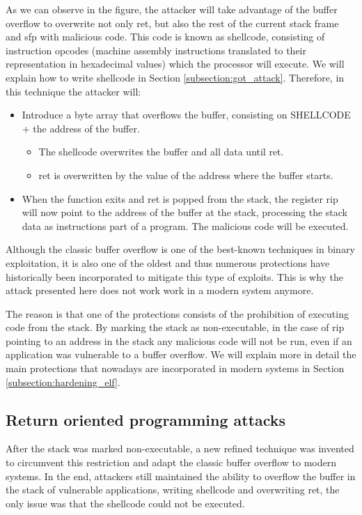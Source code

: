 As we can observe in the figure, the attacker will take advantage of the buffer overflow to overwrite not only ret, but also the rest of the current stack frame and sfp with malicious code. This code is known as shellcode, consisting of instruction opcodes (machine assembly instructions translated to their representation in hexadecimal values) which the processor will execute. We will explain how to write shellcode in Section \ref{subsection:got_attack}. Therefore, in this technique the attacker will:
\begin{itemize}
\item Introduce a byte array that overflows the buffer, consisting on SHELLCODE + the address of the buffer.
\begin{itemize}
	\item The shellcode overwrites the buffer and all data until ret.
	\item ret is overwritten by the value of the address where the buffer starts.
\end{itemize}
\item When the function exits and ret is popped from the stack, the register rip will now point to the address of the buffer at the stack, processing the stack data as instructions part of a program. The malicious code will be executed.
\end{itemize}

Although the classic buffer overflow is one of the best-known techniques in binary exploitation, it is also one of the oldest and thus numerous protections have historically been incorporated to mitigate this type of exploits. This is why the attack presented here does not work work in a modern system anymore. 

The reason is that one of the protections consists of the prohibition of executing code from the stack. By marking the stack as non-executable, in the case of rip pointing to an address in the stack any malicious code will not be run, even if an application was vulnerable to a buffer overflow. We will explain more in detail the main protections that nowadays are incorporated in modern systems in Section \ref{subsection:hardening_elf}.

\subsection{Return oriented programming attacks} \label{subsection:rop}
After the stack was marked non-executable, a new refined technique was invented to circumvent this restriction and adapt the classic buffer overflow to modern systems. In the end, attackers still maintained the ability to overflow the buffer in the stack of vulnerable applications, writing shellcode and overwriting ret, the only issue was that the shellcode could not be executed.

